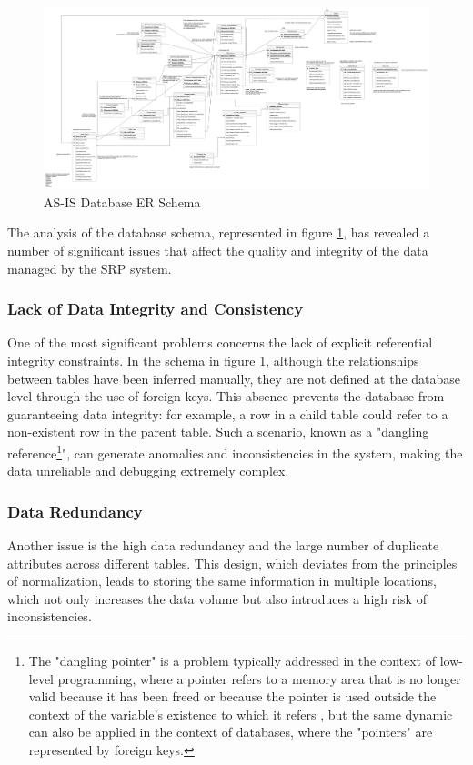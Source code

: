 \begin{figure}[htbp]
    \centering
    \includegraphics[width=\textwidth, keepaspectratio]{images/as-is/ER SRM-SRP AS-IS.drawio.png}
    \caption{AS-IS Database ER Schema}
    \label{fig:er-as-is}
\end{figure}

The analysis of the database schema, represented in figure \ref{fig:er-as-is}, has revealed a number of significant issues that affect the quality and integrity of the data managed by the SRP system.

\subsubsection{Lack of Data Integrity and Consistency}
One of the most significant problems concerns the lack of explicit referential integrity constraints. In the schema in figure \ref{fig:er-as-is}, although the relationships between tables have been inferred manually, they are not defined at the database level through the use of foreign keys. This absence prevents the database from guaranteeing data integrity: for example, a row in a child table could refer to a non-existent row in the parent table. Such a scenario, known as a "dangling reference\footnote{The "dangling pointer" is a problem typically addressed in the context of low-level programming, where a pointer refers to a memory area that is no longer valid because it has been freed or because the pointer is used outside the context of the variable's existence to which it refers \cite{apogeo-fondamenti-programmazione}, but the same dynamic can also be applied in the context of databases, where the "pointers" are represented by foreign keys.}", can generate anomalies and inconsistencies in the system, making the data unreliable and debugging extremely complex.

\subsubsection{Data Redundancy}
Another issue is the high data redundancy and the large number of duplicate attributes across different tables. This design, which deviates from the principles of normalization, leads to storing the same information in multiple locations, which not only increases the data volume but also introduces a high risk of inconsistencies.

